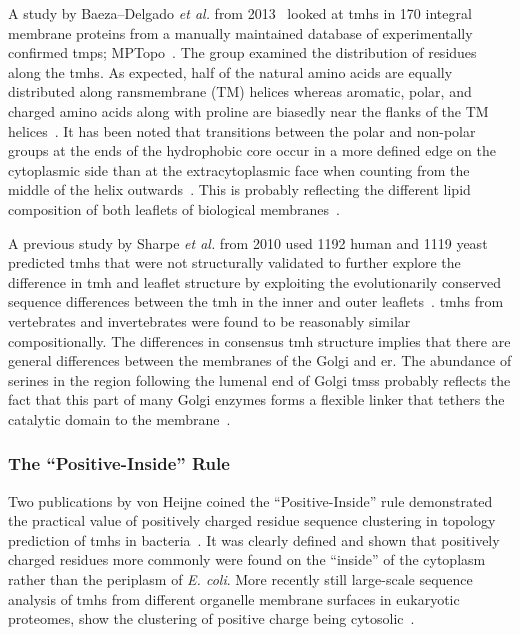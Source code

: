 A study by Baeza\---Delgado \textit{ et al.} from 2013~\cite{Baeza-Delgado2013} looked at \gls{tmh}s in 170 integral membrane proteins from a manually maintained database of experimentally confirmed \gls{tmp}s; MPTopo~\cite{Jayasinghe2001}. The group examined the distribution of residues along the \gls{tmh}s. As expected, half of the natural amino acids are equally distributed along ransmembrane (TM) helices whereas aromatic, polar, and charged amino acids along with proline are biasedly near the flanks of the TM helices~\cite{Baeza-Delgado2013}. It has been noted that transitions between the polar and non-polar groups at the ends of the hydrophobic core occur in a more defined edge on the cytoplasmic side than at the extracytoplasmic face when counting from the middle of the helix outwards~\cite{Baeza-Delgado2013}. This is probably reflecting the different lipid composition of both leaflets of biological membranes~\cite{Baeza-Delgado2013}.

A previous study by Sharpe \textit{ et al.} from 2010 used 1192 human and 1119 yeast predicted \gls{tmh}s that were not structurally validated to further explore the difference in \gls{tmh} and leaflet structure by exploiting the evolutionarily conserved sequence differences between the \gls{tmh} in the inner and outer leaflets~\cite{Sharpe2010}. \gls{tmh}s from vertebrates and invertebrates were found to be reasonably similar compositionally. The differences in consensus \gls{tmh} structure implies that there are general differences between the membranes of the Golgi and \gls{er}. The abundance of serines in the region following the lumenal end of Golgi \gls{tms}s probably reflects the fact that this part of many Golgi enzymes forms a flexible linker that tethers the catalytic domain to the membrane~\cite{Sharpe2010}.

\subsubsection{The ``Positive-Inside'' Rule}

Two publications by von Heijne coined the ``Positive-Inside'' rule demonstrated the practical value of positively charged residue sequence clustering in topology prediction of \gls{tmh}s in bacteria~\cite{VonHeijne1989,VonHeijne1992}. It was clearly defined and shown that positively charged residues more commonly were found on the ``inside'' of the cytoplasm rather than the periplasm of \textit{ E. coli}. More recently still large-scale sequence analysis of \gls{tmh}s from different organelle membrane surfaces in eukaryotic proteomes, show the clustering of positive charge being cytosolic~\cite{Sharpe2010, Baeza-Delgado2013, Pogozheva2013}.

